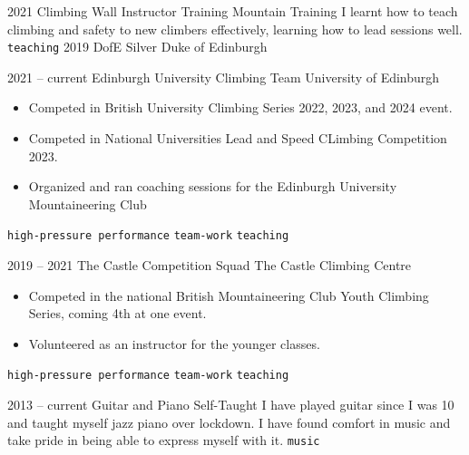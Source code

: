 \documentclass[9pt]{developercv} %
\begin{document}
\vspace{-10 pt}
\begin{entrylist}
	\entry
        {2021}
		{Climbing Wall Instructor Training}
		{Mountain Training}
		{ 
			I learnt how to teach climbing and safety to new climbers effectively, learning how to lead sessions well. 
			\newline
        	\texttt{teaching}
		}
	\entry
        {2019}
		{DofE Silver}
		{Duke of Edinburgh}
		{ 
		}
\end{entrylist}


\vspace{-10 pt}
\begin{entrylist}
	\entry
        {2021 -- current}
		{Edinburgh University Climbing Team}
		{University of Edinburgh}
		{\vspace{-10pt}
        \begin{itemize}[noitemsep,topsep=0pt,parsep=0pt,partopsep=0pt, leftmargin=-1pt]
            \item Competed in British University Climbing Series 2022, 2023, and 2024 event. 
            \item Competed in National Universities Lead and Speed CLimbing Competition 2023. 
            \item Organized and ran coaching sessions for the Edinburgh University Mountaineering Club
        \end{itemize} 
        \texttt{high-pressure performance} \slashsep \texttt{team-work} \slashsep \texttt{teaching}}
	\entry
		{2019 -- 2021}
		{The Castle Competition Squad}
		{The Castle Climbing Centre}
		{\vspace{-10pt}
        \begin{itemize}[noitemsep,topsep=0pt,parsep=0pt,partopsep=0pt, leftmargin=-1pt]
            \item Competed in the national British Mountaineering Club Youth Climbing Series, coming 4th at one event.
            \item Volunteered as an instructor for the younger classes. 
        \end{itemize} 
        \texttt{high-pressure performance} \slashsep \texttt{team-work} \slashsep \texttt{teaching}}
	\entry
		{2013 -- current}
		{Guitar and Piano}
		{Self-Taught}
		{
			I have played guitar since I was 10 and taught myself jazz piano over lockdown. 
			I have found comfort in music and take pride in being able to express myself with it. 
        \newline
		\texttt{music}
		}
\end{entrylist}
\end{document}
